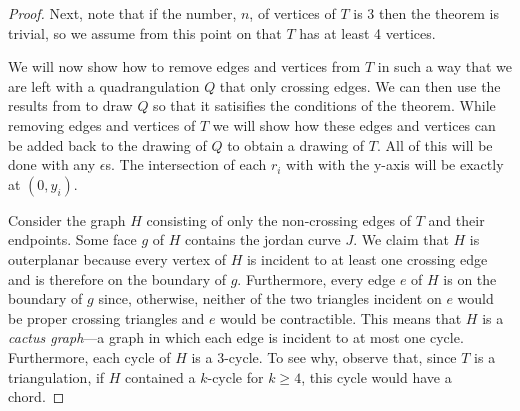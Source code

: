 \documentclass{patmorin}
\begin{document}
\begin{proof}
   Next,  note that if the number, $n$, of vertices of $T$ is 3 then
   the theorem is trivial, so we assume from this point on that $T$
   has at least 4 vertices.

   We will now show how to remove edges and vertices from $T$ in such a
   way that we are left with a quadrangulation $Q$ that only crossing
   edges.  We can then use the results from 
   to draw $Q$ so that it satisifies the conditions of the theorem.
   While removing edges and vertices of $T$ we will show how these edges
   and vertices can be added back to the drawing of $Q$ to obtain a
   drawing of $T$.  All of this will be done with any $\epsilon$s. The
   intersection of each $r_i$ with with the y-axis will be exactly
   at $(0,y_i)$.

   Consider the graph $H$ consisting of only the non-crossing edges of
   $T$ and their endpoints.  Some face $g$ of $H$ contains the jordan
   curve $J$.  We claim that $H$ is outerplanar because every vertex of
   $H$ is incident to at least one crossing edge and is therefore on the
   boundary of $g$.  Furthermore, every edge $e$ of $H$ is on the boundary
   of $g$ since, otherwise, neither of the two triangles incident on $e$
   would be proper crossing triangles and $e$ would be contractible.
   This means that $H$ is a \emph{cactus graph}---a graph in which each
   edge is incident to at most one cycle.  Furthermore, each cycle of $H$
   is a 3-cycle.  To see why, observe that, since $T$ is a triangulation,
   if $H$ contained a $k$-cycle for $k\ge 4$, this cycle would have a chord.


\end{proof}
\end{document}
